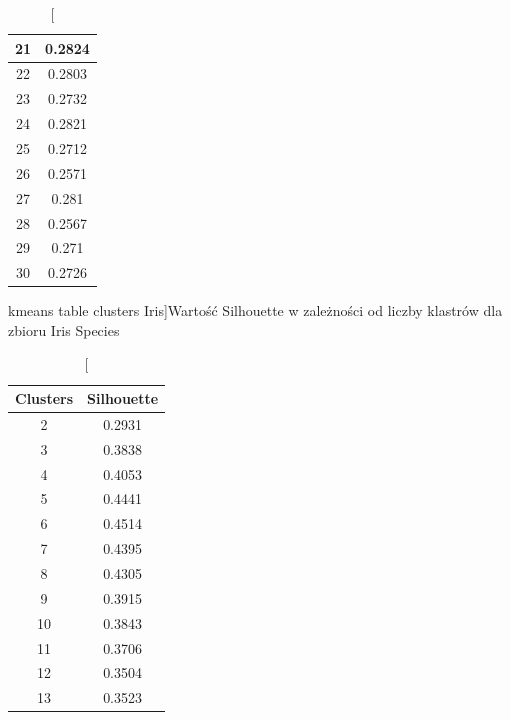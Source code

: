 \documentclass{classrep}
\begin{document}
{{\begin{table}[!htbp]
\begin{minipage}{.24\textwidth}
\begin{tabular}{|c|c|}
                        21 & 0.2824 \\ \hline
                        22 & 0.2803 \\ \hline
                        23 & 0.2732 \\ \hline
                        24 & 0.2821 \\ \hline
                        25 & 0.2712 \\ \hline
                        26 & 0.2571 \\ \hline
                        27 & 0.281 \\ \hline
                        28 & 0.2567 \\ \hline
                        29 & 0.271 \\ \hline
                        30 & 0.2726 \\ \hline
                    \end{tabular}
                    \caption
                    [kmeans table clusters Iris]{Wartość Silhouette w zależności od
                    liczby klastrów dla zbioru Iris Species}
                    \label{kmeans_table_clusters_Iris}
                \end{minipage}
                \hfill
                \begin{minipage}{.24\textwidth}
                    \centering
                    \begin{tabular}{|c|c|}
                        \hline
                        Clusters & Silhouette \\ \hline
                        2 & 0.2931 \\ \hline
                        3 & 0.3838 \\ \hline
                        4 & 0.4053 \\ \hline
                        5 & 0.4441 \\ \hline
                        6 & 0.4514 \\ \hline
                        7 & 0.4395 \\ \hline
                        8 & 0.4305 \\ \hline
                        9 & 0.3915 \\ \hline
                        10 & 0.3843 \\ \hline
                        11 & 0.3706 \\ \hline
                        12 & 0.3504 \\ \hline
                        13 & 0.3523 \\ \hline

\end{tabular}
\end{minipage}
\end{table}}}
\end{document}
